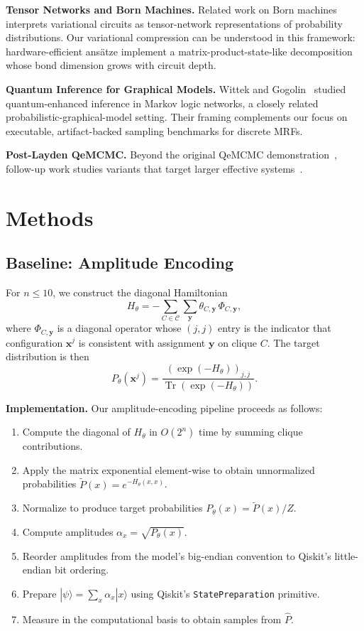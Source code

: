 \documentclass[conference,10pt]{IEEEtran}
\begin{document}
\textbf{Tensor Networks and Born Machines.} Related work on Born machines~\cite{huggins2019towards,liu2018differentiable,benedetti2019generative} interprets variational circuits as tensor-network representations of probability distributions. Our variational compression can be understood in this framework: hardware-efficient ans\"atze implement a matrix-product-state-like decomposition whose bond dimension grows with circuit depth.

\textbf{Quantum Inference for Graphical Models.} Wittek and Gogolin~\cite{wittek2017quantum} studied quantum-enhanced inference in Markov logic networks, a closely related probabilistic-graphical-model setting. Their framing complements our focus on executable, artifact-backed sampling benchmarks for discrete MRFs.

\textbf{Post-Layden QeMCMC.} Beyond the original QeMCMC demonstration~\cite{layden2023qemcmc}, follow-up work studies variants that target larger effective systems~\cite{ferguson2025qemcmc}.

\section{Methods}

\subsection{Baseline: Amplitude Encoding}

For $n \le 10$, we construct the diagonal Hamiltonian
\begin{equation}
H_\theta = -\sum_{C\in\mathcal{C}}\sum_{\boldsymbol{y}} \theta_{C,\boldsymbol{y}}\,\Phi_{C,\boldsymbol{y}},
\end{equation}
where $\Phi_{C,\boldsymbol{y}}$ is a diagonal operator whose $(j,j)$ entry is the indicator that configuration $\mathbf{x}^j$ is consistent with assignment $\boldsymbol{y}$ on clique $C$. The target distribution is then
\[
P_\theta(\mathbf{x}^j) = \frac{(\exp(-H_\theta))_{j,j}}{\operatorname{Tr}(\exp(-H_\theta))}.
\]

\textbf{Implementation.} Our amplitude-encoding pipeline proceeds as follows:
\begin{enumerate}[leftmargin=*]
    \item Compute the diagonal of $H_\theta$ in $O(2^n)$ time by summing clique contributions.
    \item Apply the matrix exponential element-wise to obtain unnormalized probabilities $\tilde{P}(x) = e^{-H_\theta(x,x)}$.
    \item Normalize to produce target probabilities $P_\theta(x) = \tilde{P}(x)/Z$.
    \item Compute amplitudes $\alpha_x = \sqrt{P_\theta(x)}$.
    \item Reorder amplitudes from the model's big-endian convention to Qiskit's little-endian bit ordering.
    \item Prepare $|\psi\rangle = \sum_x \alpha_x |x\rangle$ using Qiskit's \texttt{StatePreparation} primitive.
    \item Measure in the computational basis to obtain samples from $\hat{P}$.
\end{enumerate}
\end{document}
